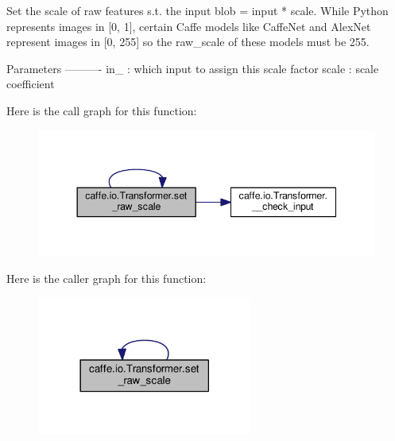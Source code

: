 \begin{DoxyVerb}Set the scale of raw features s.t. the input blob = input * scale.
While Python represents images in [0, 1], certain Caffe models
like CaffeNet and AlexNet represent images in [0, 255] so the raw_scale
of these models must be 255.

Parameters
----------
in_ : which input to assign this scale factor
scale : scale coefficient
\end{DoxyVerb}
 Here is the call graph for this function\+:
\nopagebreak
\begin{figure}[H]
\begin{center}
\leavevmode
\includegraphics[width=344pt]{classcaffe_1_1io_1_1_transformer_aa02e06527de8f0e02d3065bf83b875a9_cgraph}
\end{center}
\end{figure}
Here is the caller graph for this function\+:
\nopagebreak
\begin{figure}[H]
\begin{center}
\leavevmode
\includegraphics[width=201pt]{classcaffe_1_1io_1_1_transformer_aa02e06527de8f0e02d3065bf83b875a9_icgraph}
\end{center}
\end{figure}
\mbox{\label{classcaffe_1_1io_1_1_transformer_aa02e06527de8f0e02d3065bf83b875a9}} 
